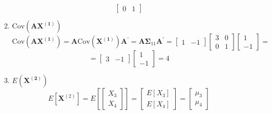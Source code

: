 \begin{enumerate}[font=\bfseries]
\begin{enumerate}
\[\begin{bmatrix}
                    0 & 1
                \end{bmatrix}
            \]
            \item $\text{Cov}\left(\mathbf{A}\mathbf{X^{(1)}}\right)$
            \[
                \text{Cov}\left(\mathbf{A}\mathbf{X^{(1)}}\right)
                =
                \mathbf{A}\text{Cov}\left(\mathbf{X^{(1)}}\right)\mathbf{A}^\prime
                =
                \mathbf{A}\mathbf{\Sigma}_{11}\mathbf{A}^\prime
                =
                \begin{bmatrix}
                    1 & -1
                \end{bmatrix}
                \begin{bmatrix}
                    3 & 0 \\
                    0 & 1
                \end{bmatrix}
                \begin{bmatrix}
                    1 \\
                    -1
                \end{bmatrix}
                =
            \]
            \[
                =
                \begin{bmatrix}
                    3 & -1
                \end{bmatrix}
                \begin{bmatrix}
                    1 \\
                    -1
                \end{bmatrix}
                = 4
            \]
            \item $E\left(\mathbf{X^{(2)}}\right)$
            \[
                E\left[\mathbf{X}^{(2)}\right]
                = 
                E\left[
                    \begin{bmatrix}
                        X_3 \\
                        X_4
                    \end{bmatrix}
                \right]
                =
                \begin{bmatrix}
                    E[X_3] \\
                    E[X_4]
                \end{bmatrix}
                =
                \begin{bmatrix}
                    \mu_3 \\
                    \mu_4
                \end{bmatrix}
\]
\end{enumerate}
\end{enumerate}
